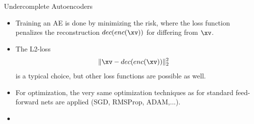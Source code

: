 \begin{vbframe}{Undercomplete Autoencoders}

  \begin{itemize}
    \item %
    Training an AE is done by minimizing the risk, where the loss function penalizes the reconstruction  $dec(enc(\xv))$ for differing from $\xv$. 
    \item The L2-loss 
    $$
    \|\xv - dec(enc(\xv))\|^2_2
    $$
    is a typical choice, but other loss functions are possible as well. 
    \item For optimization, the very same optimization techniques as for standard feed-forward nets are applied (SGD, RMSProp, ADAM,...).
    \item[]
  \end{itemize}

\end{vbframe}


